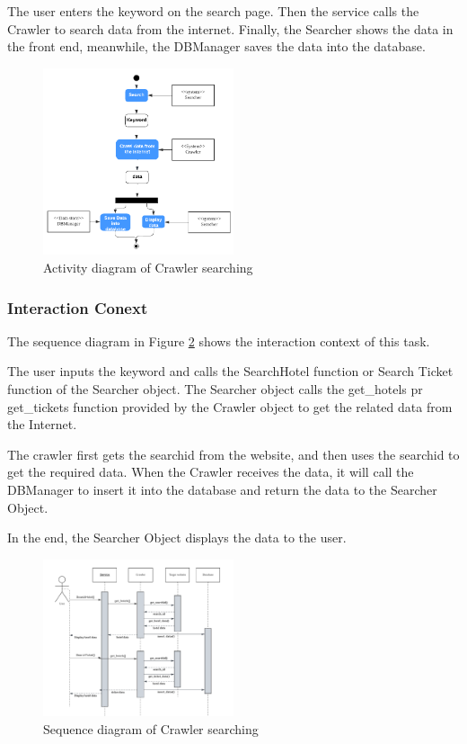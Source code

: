 \documentclass[conference]{IEEEtran}
\begin{document}
The user enters the keyword on the search page. Then the service calls the Crawler to search data from the internet. Finally, the Searcher shows the data in the front end, meanwhile, the DBManager saves the data into the database.
\begin{figure}[htbp]
	\centerline{\includegraphics[width=0.5\textwidth]{image/crawler activity1.pdf}}
	\caption{Activity diagram of Crawler searching }
	\label{crawleractivity1}
\end{figure}


\subsubsection{\textbf{Interaction Conext }}
\textbf{}

The sequence diagram in Figure \ref{crawlersequence1} shows the interaction context of this task. 

The user inputs the keyword and calls the SearchHotel function or Search Ticket function of the Searcher object. The Searcher object calls the get\_hotels pr get\_tickets function provided by the Crawler object to get the related data from the Internet.

The crawler first gets the searchid from the website, and then uses the searchid to get the required data. When the Crawler receives the data, it will call the DBManager to insert it into the database and return the data to the Searcher Object.

In the end, the Searcher Object displays the data to the user.
\begin{figure}[htbp]
	\centerline{\includegraphics[width=0.5\textwidth]{image/crawler searching sequence1.pdf}}
	\caption{Sequence diagram of Crawler searching }
	\label{crawlersequence1}
\end{figure}
\end{document}
